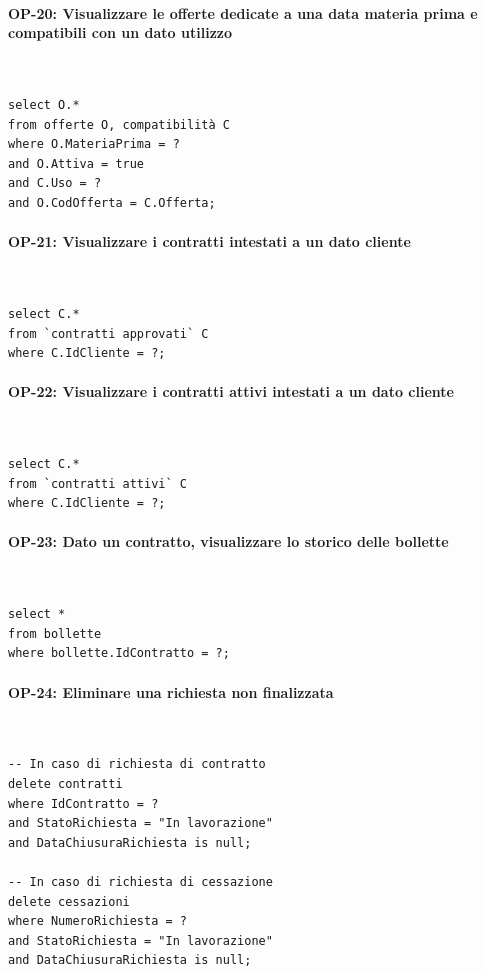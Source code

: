 \documentclass[a4paper,12pt]{report}
\begin{document}
\paragraph{OP-20: Visualizzare le offerte dedicate a una data materia prima e compatibili con un dato utilizzo}\mbox{}\\
\begin{lstlisting}
select O.*
from offerte O, compatibilità C
where O.MateriaPrima = ?
and O.Attiva = true
and C.Uso = ?
and O.CodOfferta = C.Offerta;
\end{lstlisting}

\paragraph{OP-21: Visualizzare i contratti intestati a un dato cliente}\mbox{}\\
\begin{lstlisting}
select C.*
from `contratti approvati` C
where C.IdCliente = ?;
\end{lstlisting}

\paragraph{OP-22: Visualizzare i contratti attivi intestati a un dato cliente}\mbox{}\\
\begin{lstlisting}
select C.*
from `contratti attivi` C
where C.IdCliente = ?;
\end{lstlisting}

\paragraph{OP-23: Dato un contratto, visualizzare lo storico delle bollette}\mbox{}\\
\begin{lstlisting}
select *
from bollette
where bollette.IdContratto = ?;
\end{lstlisting}

\paragraph{OP-24: Eliminare una richiesta non finalizzata}\mbox{}\\
\begin{lstlisting}
-- In caso di richiesta di contratto
delete contratti
where IdContratto = ?
and StatoRichiesta = "In lavorazione"
and DataChiusuraRichiesta is null;

-- In caso di richiesta di cessazione
delete cessazioni
where NumeroRichiesta = ?
and StatoRichiesta = "In lavorazione"
and DataChiusuraRichiesta is null;
\end{lstlisting}
\end{document}
